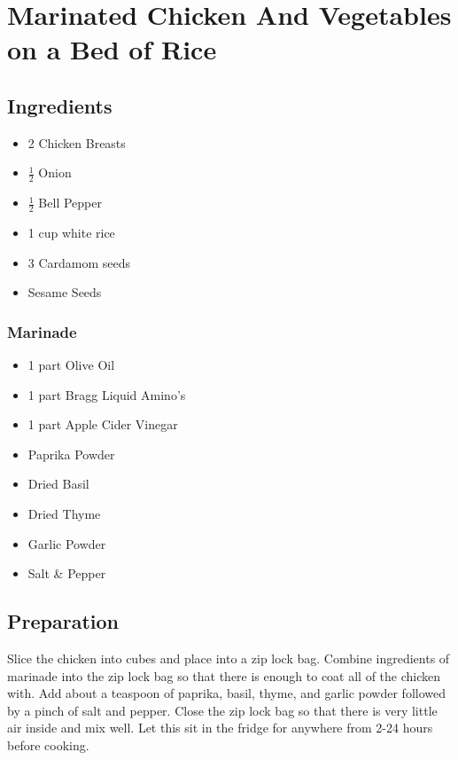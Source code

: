 \thispagestyle{fancy}
\section{Marinated Chicken And Vegetables on a Bed of Rice}
\AddToShipoutPicture*{\MarinatedChickenAndRice}

\subsection*{Ingredients}
\begin{multicols}{3}
	\begin{itemize}
		\item 2 Chicken Breasts
		\item $\frac{1}{2}$ Onion
		\item $\frac{1}{2}$ Bell Pepper 
		\item 1 cup white rice
		\item 3 Cardamom seeds
		\item Sesame Seeds
	\end{itemize}
\end{multicols}
\subsubsection*{Marinade}
\begin{multicols}{3}
	\begin{itemize}
		\item 1 part Olive Oil
		\item 1 part Bragg Liquid Amino's
		\item 1 part Apple Cider Vinegar
		\item Paprika Powder
		\item Dried Basil
		\item Dried Thyme
		\item Garlic Powder
		\item Salt \& Pepper
	\end{itemize}
\end{multicols}

\subsection*{Preparation}

Slice the chicken into cubes and place into a zip lock bag. Combine ingredients of marinade into the zip lock bag so that there is enough to coat all of the chicken with. Add about a teaspoon of paprika, basil, thyme, and garlic powder followed by a pinch of salt and pepper. Close the zip lock bag so that there is very little air inside and mix well. Let this sit in the fridge for anywhere from 2-24 hours before cooking.

